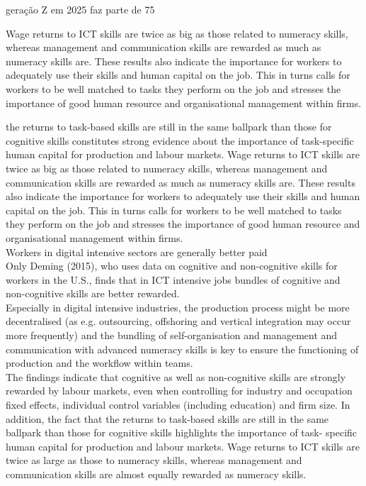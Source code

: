 geração Z em 2025 faz parte de 75%

Wage returns to ICT skills are twice as big as those related to numeracy skills, whereas management and communication skills are rewarded as much as numeracy skills are. These results also indicate the importance for workers to adequately use their skills and human capital on the job. This in turns calls for workers to be well matched to tasks they perform on the job and stresses the importance of good human resource and organisational management within firms.

the returns to task-based skills are still in the same ballpark than those for cognitive skills constitutes strong evidence about the importance of task-specific human capital for production and labour markets. Wage returns to ICT skills are twice as big as those related to numeracy skills, whereas management and communication skills are rewarded as much as numeracy skills are. These results also indicate the importance for workers to adequately use their skills and human capital on the job. This in turns calls for workers to be well matched to tasks they perform on the job and stresses the importance of good human resource and organisational management within firms.\\

Workers in digital intensive sectors are generally better paid\\

Only Deming (2015), who uses data on cognitive and non-cognitive skills for workers in the U.S., finds that in ICT intensive jobs bundles of cognitive and non-cognitive skills are better rewarded.\\

Especially in digital intensive industries, the production process might be more decentralised (as e.g. outsourcing, offshoring and vertical integration may occur more frequently) and the bundling of self-organisation and management and communication with advanced numeracy skills is key to ensure the functioning of production and the workflow within teams.\\

The findings indicate that cognitive as well as non-cognitive skills are strongly rewarded by labour markets, even when controlling for industry and occupation fixed effects, individual control variables (including education) and firm size. In addition, the fact that the returns to task-based skills are still in the same ballpark than those for cognitive skills highlights the importance of task- specific human capital for production and labour markets. Wage returns to ICT skills are twice as large as those to numeracy skills, whereas management and communication skills are almost equally rewarded as numeracy skills.\\

